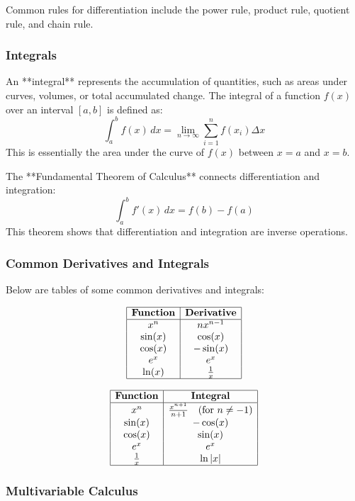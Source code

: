 \documentclass{article}
\begin{document}
Common rules for differentiation include the power rule, product rule, quotient rule, and chain rule.

\subsubsection*{Integrals}

An **integral** represents the accumulation of quantities, such as areas under curves, volumes, or total accumulated change. The integral of a function \( f(x) \) over an interval \( [a, b] \) is defined as:
\[
\int_a^b f(x) \, dx = \lim_{n \to \infty} \sum_{i=1}^{n} f(x_i) \Delta x
\]
This is essentially the area under the curve of \( f(x) \) between \( x = a \) and \( x = b \).

The **Fundamental Theorem of Calculus** connects differentiation and integration:
\[
\int_a^b f'(x) \, dx = f(b) - f(a)
\]
This theorem shows that differentiation and integration are inverse operations.

\subsubsection*{Common Derivatives and Integrals}

Below are tables of some common derivatives and integrals:

\[
\begin{array}{|c|c|}
\hline
\textbf{Function} & \textbf{Derivative} \\
\hline
x^n & n x^{n-1} \\
\sin(x) & \cos(x) \\
\cos(x) & -\sin(x) \\
e^x & e^x \\
\ln(x) & \frac{1}{x} \\
\hline
\end{array}
\]

\[
\begin{array}{|c|c|}
\hline
\textbf{Function} & \textbf{Integral} \\
\hline
x^n & \frac{x^{n+1}}{n+1} \quad \text{(for } n \neq -1) \\
\sin(x) & -\cos(x) \\
\cos(x) & \sin(x) \\
e^x & e^x \\
\frac{1}{x} & \ln|x| \\
\hline
\end{array}
\]

\subsubsection*{Multivariable Calculus}
\end{document}
